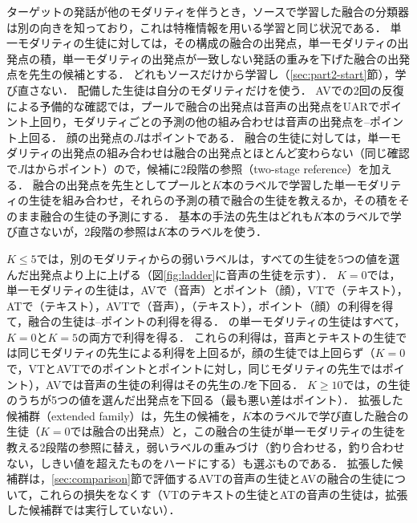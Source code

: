 ターゲットの発話が他のモダリティを伴うとき，ソースで学習した融合の分類器は別の向きを知っており，これは特権情報を用いる学習と同じ状況である\cite{lopezpaz2016unifying,vapnik2009new}．
単一モダリティの生徒に対しては，その構成の融合の出発点，単一モダリティの出発点の積，単一モダリティの出発点が一致しない発話の重みを下げた融合の出発点を先生の候補とする．
どれもソースだけから学習し（\ref{sec:part2-start}節），学び直さない．
配備した生徒は自分のモダリティだけを使う．
AVでの2回の反復による予備的な確認では，プールで融合の出発点は音声の出発点をUARでポイント上回り，モダリティごとの予測の他の組み合わせは音声の出発点を--ポイント上回る．
顔の出発点の$J$はポイントである．
融合の生徒に対しては，単一モダリティの出発点の組み合わせは融合の出発点とほとんど変わらない（同じ確認で$J$はからポイント）ので，候補に2段階の参照（two-stage reference）を加える．
融合の出発点を先生としてプールと$K$本のラベルで学習した単一モダリティの生徒を組み合わせ，それらの予測の積で融合の生徒を教えるか，その積をそのまま融合の生徒の予測にする．
基本の手法の先生はどれも$K$本のラベルで学び直さないが，2段階の参照は$K$本のラベルを使う．

$K \le 5$では，別のモダリティからの弱いラベルは，すべての生徒を5つの値を選んだ出発点より上に上げる（図\ref{fig:ladder}に音声の生徒を示す）．
$K=0$では，単一モダリティの生徒は，AVで（音声）とポイント（顔），VTで（テキスト），ATで（テキスト），AVTで（音声），（テキスト），ポイント（顔）の利得を得て，融合の生徒は--ポイントの利得を得る．
の単一モダリティの生徒はすべて，$K=0$と$K=5$の両方で利得を得る．
これらの利得は，音声とテキストの生徒では同じモダリティの先生による利得を上回るが，顔の生徒では上回らず（$K=0$で，VTとAVTでのポイントとポイントに対し，同じモダリティの先生ではポイント），AVでは音声の生徒の利得はその先生の$J$を下回る．
$K \ge 10$では，の生徒のうちが5つの値を選んだ出発点を下回る（最も悪い差はポイント）．
拡張した候補群（extended family）は，先生の候補を，$K$本のラベルで学び直した融合の生徒（$K=0$では融合の出発点）と，この融合の生徒が単一モダリティの生徒を教える2段階の参照に替え，弱いラベルの重みづけ（釣り合わせる，釣り合わせない，しきい値を超えたものをハードにする）も選ぶものである．
拡張した候補群は，\ref{sec:comparison}節で評価するAVTの音声の生徒とAVの融合の生徒について，これらの損失をなくす（VTのテキストの生徒とATの音声の生徒は，拡張した候補群では実行していない）．

